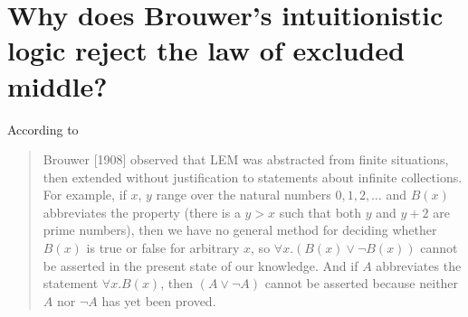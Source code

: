 \section{Why does Brouwer's intuitionistic logic reject the law of excluded middle?}
According to \cite{stanfordLogic} 
\begin{quote}
Brouwer [1908] observed that LEM was abstracted from finite situations, then extended without justification to statements about infinite collections. For example, if $x$, $y$ range over the natural numbers $0, 1, 2, \ldots$ and $B(x)$ abbreviates the property (there is a $y > x$ such that both $y$ and $y+2$ are prime numbers), then we have no general method for deciding whether $B(x)$ is true or false for arbitrary $x$, so $\forall x . (B(x) \vee \neg B(x))$ cannot be asserted in the present state of our knowledge. And if $A$ abbreviates the statement $\forall x . B(x)$, then $(A \vee \neg A)$ cannot be asserted because neither $A$ nor $\neg A$ has yet been proved.
\end{quote}


